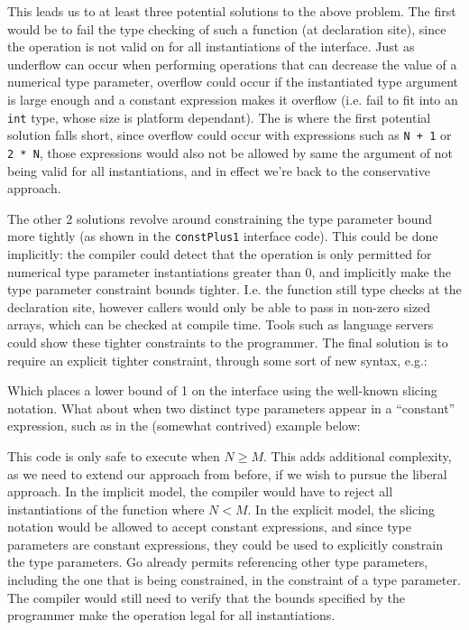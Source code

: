 
This leads us to at least three potential solutions to the above problem. The
first would be to fail the type checking of such a function (at declaration
site), since the operation is not valid on for all instantiations of the
 interface. Just as underflow can occur when performing operations
that can decrease the value of a numerical type parameter, overflow could occur
if the instantiated type argument is large enough and a constant expression
makes it overflow (i.e. fail to fit into an \texttt{int} type, whose size is
platform dependant). The is where the first potential solution falls short,
since overflow could occur with expressions such as \texttt{N + 1} or \texttt{2
    * N}, those expressions would also not be allowed by same the argument of not
being valid for all instantiations, and in effect we're back to the conservative
approach.

The other 2 solutions revolve around constraining the type parameter bound more
tightly (as shown in the \texttt{constPlus1} interface code). This could be done
implicitly: the compiler could detect that the operation is only permitted for
numerical type parameter instantiations greater than 0, and implicitly make the
type parameter constraint bounds tighter. I.e. the function still type checks at
the declaration site, however callers would only be able to pass in non-zero
sized arrays, which can be checked at compile time. Tools such as language
servers could show these tighter constraints to the programmer. The final
solution is to require an explicit tighter constraint, through some sort of new
syntax, e.g.:


Which places a lower bound of 1 on the  interface using the well-known
slicing notation. What about when two distinct type parameters appear in a
``constant'' expression, such as in the (somewhat contrived) example below:


This code is only safe to execute when $N \ge M$. This adds additional
complexity, as we need to extend our approach from before, if we wish to pursue
the liberal approach. In the implicit model, the compiler would have to reject
all instantiations of the function where $N < M$. In the explicit model, the
slicing notation would be allowed to accept constant expressions, and since type
parameters are constant expressions, they could be used to explicitly constrain
the type parameters. Go already permits referencing other type parameters,
including the one that is being constrained, in the constraint of a type
parameter. The compiler would still need to verify that the bounds specified by
the programmer make the operation legal for all instantiations.

